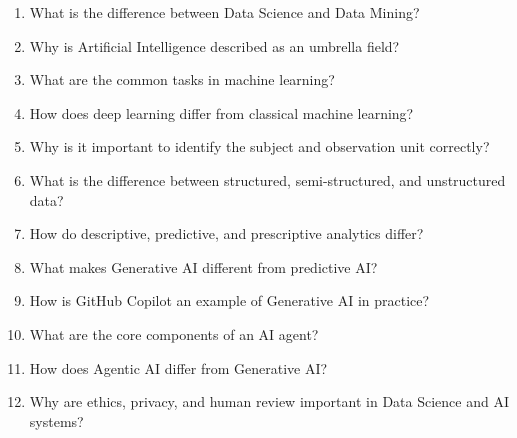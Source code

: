 \documentclass[11pt,a4paper]{article}
\begin{document}
\begin{enumerate}[leftmargin=*]
  \item What is the difference between Data Science and Data Mining?
  \item Why is Artificial Intelligence described as an umbrella field?
  \item What are the common tasks in machine learning?
  \item How does deep learning differ from classical machine learning?
  \item Why is it important to identify the subject and observation unit correctly?
  \item What is the difference between structured, semi-structured, and unstructured data?
  \item How do descriptive, predictive, and prescriptive analytics differ?
  \item What makes Generative AI different from predictive AI?
  \item How is GitHub Copilot an example of Generative AI in practice?
  \item What are the core components of an AI agent?
  \item How does Agentic AI differ from Generative AI?
  \item Why are ethics, privacy, and human review important in Data Science and AI systems?
\end{enumerate}
\end{document}
